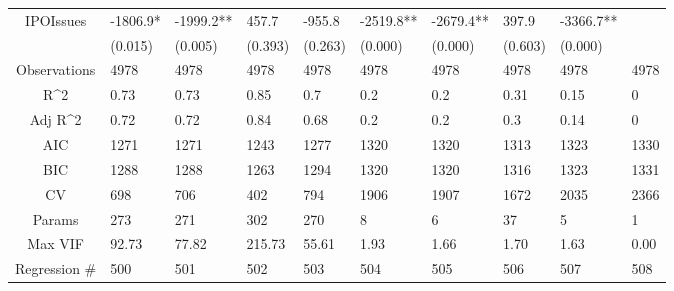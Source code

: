 \documentclass{article}
\begin{document}
\begin{table}[H]
\begin{tabular}{|clllllllll|}
  IPOIssues & -1806.9* & -1999.2** & 457.7 & -955.8 & -2519.8** & -2679.4** & 397.9 & -3366.7** &  \\ 
   & (0.015) & (0.005) & (0.393) & (0.263) & (0.000) & (0.000) & (0.603) & (0.000) &  \\ 
  \hline 
 Observations & 4978 & 4978 & 4978 & 4978 & 4978 & 4978 & 4978 & 4978 & 4978 \\ 
  R^2 & 0.73 & 0.73 & 0.85 & 0.7 & 0.2 & 0.2 & 0.31 & 0.15 & 0 \\ 
  Adj R^2 & 0.72 & 0.72 & 0.84 & 0.68 & 0.2 & 0.2 & 0.3 & 0.14 & 0 \\ 
  AIC & 1271 & 1271 & 1243 & 1277 & 1320 & 1320 & 1313 & 1323 & 1330 \\ 
  BIC & 1288 & 1288 & 1263 & 1294 & 1320 & 1320 & 1316 & 1323 & 1331 \\ 
  CV & 698 & 706 & 402 & 794 & 1906 & 1907 & 1672 & 2035 & 2366 \\ 
  Params & 273 & 271 & 302 & 270 & 8 & 6 & 37 & 5 & 1 \\ 
  Max VIF & 92.73 & 77.82 & 215.73 & 55.61 & 1.93 & 1.66 & 1.70 & 1.63 & 0.00 \\ 
  Regression \# & 500 & 501 & 502 & 503 & 504 & 505 & 506 & 507 & 508 \\ 
   \hline
\end{tabular}
 
\end{table}
\end{document}
